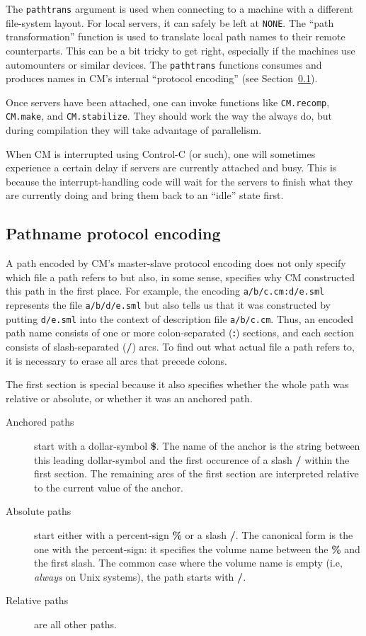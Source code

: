 \documentclass[titlepage,letterpaper]{article}
\begin{document}
The {\tt pathtrans} argument is used when connecting to a machine with
a different file-system layout.  For local servers, it can safely be
left at {\tt NONE}.  The ``path transformation'' function is used to
translate local path names to their remote counterparts.  This can be
a bit tricky to get right, especially if the machines use automounters
or similar devices.  The {\tt pathtrans} functions consumes and
produces names in CM's internal ``protocol encoding'' (see
Section~\ref{sec:pathencode}).

Once servers have been attached, one can invoke functions like
{\tt CM.recomp}, {\tt CM.make}, and {\tt CM.stabilize}.  They should
work the way the always do, but during compilation they will take
advantage of parallelism.

When CM is interrupted using Control-C (or such), one will sometimes
experience a certain delay if servers are currently attached and busy.
This is because the interrupt-handling code will wait for the servers
to finish what they are currently doing and bring them back to an
``idle'' state first.

\subsection{Pathname protocol encoding}
\label{sec:pathencode}

A path encoded by CM's master-slave protocol encoding does not only
specify which file a path refers to but also, in some sense, specifies
why CM constructed this path in the first place.  For example, the
encoding {\tt a/b/c.cm:d/e.sml} represents the file {\tt a/b/d/e.sml}
but also tells us that it was constructed by putting {\tt d/e.sml}
into the context of description file {\tt a/b/c.cm}.  Thus, an encoded
path name consists of one or more colon-separated ({\bf :}) sections,
and each section consists of slash-separated ({\bf /}) arcs.  To find
out what actual file a path refers to, it is necessary to erase all
arcs that precede colons.

The first section is special because it also specifies whether the
whole path was relative or absolute, or whether it was an anchored
path.

\begin{description}
\item[Anchored paths] start with a dollar-symbol {\bf \$}.  The name
of the anchor is the string between this leading dollar-symbol and the
first occurence of a slash {\bf /} within the first section.  The
remaining arcs of the first section are interpreted relative to the
current value of the anchor.
\item[Absolute paths] start either with a percent-sign {\bf \%} or a
slash {\bf /}.  The canonical form is the one with the percent-sign:
it specifies the volume name between the {\bf \%} and the first slash.
The common case where the volume name is empty (i.e, {\em always} on
Unix systems), the path starts with {\bf /}.
\item[Relative paths] are all other paths.
\end{description}
\end{document}
